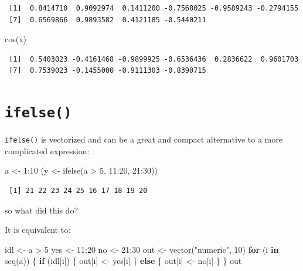 \documentclass[
]{book}
\newenvironment{Shaded}{\begin{snugshade}}{\end{snugshade}}
\newcommand{\ControlFlowTok}[1]{\textcolor[rgb]{0.13,0.29,0.53}{\textbf{#1}}}
\newcommand{\DecValTok}[1]{\textcolor[rgb]{0.00,0.00,0.81}{#1}}
\newcommand{\FunctionTok}[1]{\textcolor[rgb]{0.00,0.00,0.00}{#1}}
\newcommand{\NormalTok}[1]{#1}
\newcommand{\OtherTok}[1]{\textcolor[rgb]{0.56,0.35,0.01}{#1}}
\newcommand{\SpecialCharTok}[1]{\textcolor[rgb]{0.00,0.00,0.00}{#1}}
\newcommand{\StringTok}[1]{\textcolor[rgb]{0.31,0.60,0.02}{#1}}
\begin{document}
\begin{verbatim}
 [1]  0.8414710  0.9092974  0.1411200 -0.7568025 -0.9589243 -0.2794155
 [7]  0.6569866  0.9893582  0.4121185 -0.5440211
\end{verbatim}

\begin{Shaded}
\begin{Highlighting}[]
\FunctionTok{cos}\NormalTok{(x)}
\end{Highlighting}
\end{Shaded}

\begin{verbatim}
 [1]  0.5403023 -0.4161468 -0.9899925 -0.6536436  0.2836622  0.9601703
 [7]  0.7539023 -0.1455000 -0.9111303 -0.8390715
\end{verbatim}

\hypertarget{ifelse}{%
\section{\texorpdfstring{\texttt{ifelse()}}{ifelse()}}\label{ifelse}}

\texttt{ifelse()} is vectorized and can be a great and compact alternative to a more complicated expression:

\begin{Shaded}
\begin{Highlighting}[]
\NormalTok{a }\OtherTok{\textless{}{-}} \DecValTok{1}\SpecialCharTok{:}\DecValTok{10}
\NormalTok{(y }\OtherTok{\textless{}{-}} \FunctionTok{ifelse}\NormalTok{(a }\SpecialCharTok{\textgreater{}} \DecValTok{5}\NormalTok{, }\DecValTok{11}\SpecialCharTok{:}\DecValTok{20}\NormalTok{, }\DecValTok{21}\SpecialCharTok{:}\DecValTok{30}\NormalTok{))}
\end{Highlighting}
\end{Shaded}

\begin{verbatim}
 [1] 21 22 23 24 25 16 17 18 19 20
\end{verbatim}

so what did this do?

It is equivalent to:

\begin{Shaded}
\begin{Highlighting}[]
\NormalTok{idl }\OtherTok{\textless{}{-}}\NormalTok{ a }\SpecialCharTok{\textgreater{}} \DecValTok{5}
\NormalTok{yes }\OtherTok{\textless{}{-}} \DecValTok{11}\SpecialCharTok{:}\DecValTok{20}
\NormalTok{no }\OtherTok{\textless{}{-}} \DecValTok{21}\SpecialCharTok{:}\DecValTok{30}
\NormalTok{out }\OtherTok{\textless{}{-}} \FunctionTok{vector}\NormalTok{(}\StringTok{"numeric"}\NormalTok{, }\DecValTok{10}\NormalTok{)}
\ControlFlowTok{for}\NormalTok{ (i }\ControlFlowTok{in} \FunctionTok{seq}\NormalTok{(a)) \{}
  \ControlFlowTok{if}\NormalTok{ (idl[i]) \{}
\NormalTok{    out[i] }\OtherTok{\textless{}{-}}\NormalTok{ yes[i]}
\NormalTok{  \} }\ControlFlowTok{else}\NormalTok{ \{}
\NormalTok{    out[i] }\OtherTok{\textless{}{-}}\NormalTok{ no[i]}
\NormalTok{  \}}
\NormalTok{\}}
\NormalTok{out}
\end{Highlighting}
\end{Shaded}
\end{document}
